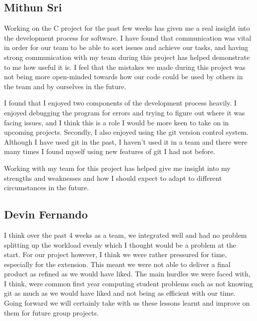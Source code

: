 \documentclass[11pt]{article}
\begin{document}
\subsection*{Mithun Sri}
Working on the C project for the past few weeks has given me a real insight into the development process for software. I have found that communication was vital in order for our team to be able to sort issues and achieve our tasks, and having strong communication with my team during this project has helped demonstrate to me how useful it is. I feel that the mistakes we made during this  project was not being more open-minded towards how our code could be used by others in the team and by ourselves in the future. 

I found that I enjoyed two components of the development process heavily. I enjoyed debugging the program for errors and trying to figure out where it was facing issues, and I think this is a role I would be more keen to take on in upcoming projects. Secondly, I also enjoyed using the git version control system. Although I have used git in the past, I haven’t used it in a team and there were many times I found myself using new features of git I had not before.

Working with my team for this project has helped give me insight into my strengths and weaknesses and how I should expect to adapt to different circumstances in the future.

\subsection*{Devin Fernando}
I think over the past 4 weeks as a team, we integrated well and had no problem splitting up the workload evenly which I thought would be a problem at the start. For our project however, I think we were rather pressured for time, especially for the extension. This meant we were not able to deliver a final product as refined as we would have liked. The main hurdles we were faced with, I think, were common first year computing student problems such as not knowing git as much as we would have liked and not being as efficient with our time. Going forward we will certainly take with us these lessons learnt and improve on them for future group projects.
\end{document}
